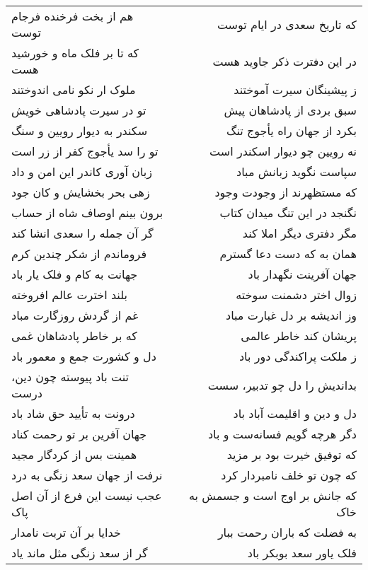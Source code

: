 \begin{center}
\begin{longtable}{l p{0.5cm} r}
\\
هم از بخت فرخنده فرجام توست
&&
که تاریخ سعدی در ایام توست
\\
که تا بر فلک ماه و خورشید هست
&&
در این دفترت ذکر جاوید هست
\\
ملوک ار نکو نامی اندوختند
&&
ز پیشینگان سیرت آموختند
\\
تو در سیرت پادشاهی خویش
&&
سبق بردی از پادشاهان پیش
\\
سکندر به دیوار رویین و سنگ
&&
بکرد از جهان راه یأجوج تنگ
\\
تو را سد یأجوج کفر از زر است
&&
نه رویین چو دیوار اسکندر است
\\
زبان آوری کاندر این امن و داد
&&
سپاست نگوید زبانش مباد
\\
زهی بحر بخشایش و کان جود
&&
که مستظهرند از وجودت وجود
\\
برون بینم اوصاف شاه از حساب
&&
نگنجد در این تنگ میدان کتاب
\\
گر آن جمله را سعدی انشا کند
&&
مگر دفتری دیگر املا کند
\\
فروماندم از شکر چندین کرم
&&
همان به که دست دعا گسترم
\\
جهانت به کام و فلک یار باد
&&
جهان آفرینت نگهدار باد
\\
بلند اخترت عالم افروخته
&&
زوال اختر دشمنت سوخته
\\
غم از گردش روزگارت مباد
&&
وز اندیشه بر دل غبارت مباد
\\
که بر خاطر پادشاهان غمی
&&
پریشان کند خاطر عالمی
\\
دل و کشورت جمع و معمور باد
&&
ز ملکت پراکندگی دور باد
\\
تنت باد پیوسته چون دین، درست
&&
بداندیش را دل چو تدبیر، سست
\\
درونت به تأیید حق شاد باد
&&
دل و دین و اقلیمت آباد باد
\\
جهان آفرین بر تو رحمت کناد
&&
دگر هرچه گویم فسانه‌ست و باد
\\
همینت بس از کردگار مجید
&&
که توفیق خیرت بود بر مزید
\\
نرفت از جهان سعد زنگی به درد
&&
که چون تو خلف نامبردار کرد
\\
عجب نیست این فرع از آن اصل پاک
&&
که جانش بر اوج است و جسمش به خاک
\\
خدایا بر آن تربت نامدار
&&
به فضلت که باران رحمت ببار
\\
گر از سعد زنگی مثل ماند یاد
&&
فلک یاور سعد بوبکر باد
\\
\end{longtable}
\end{center}
